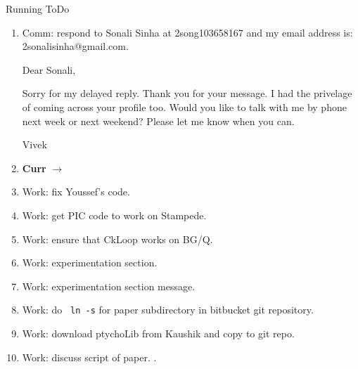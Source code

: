 \begin{columns}
\begin{column}{0.5\linewidth}
      \begin{block}{Running ToDo} %
        \begin{enumerate} 
            \item \tiny Comm: respond to Sonali Sinha at 2song103658167
            and my email address is: 2sonalisinha@gmail.com.

            Dear Sonali,

            Sorry for my delayed reply. Thank you for your message. I had
            the privelage of coming across your profile too. Would
            you like to talk with me by phone next week or next weekend? 
            Please let me know when you can.
           
            Vivek

          \item \tiny \textbf{Curr} $\rightarrow$
          \item \tiny Work: fix Youssef's code. 
          \item \tiny Work: get PIC code to work on Stampede. 
          \item \tiny Work: ensure that CkLoop works on BG/Q. 
          \item \tiny Work: experimentation section. 
          \item \tiny Work: experimentation section message.
          \item \tiny Work: do \texttt{ ln -s} for paper subdirectory in bitbucket git repository.
          \item \tiny Work: download ptychoLib from Kaushik and copy to git repo.            
          \item \tiny Work: discuss script of paper. 
             . 


\end{enumerate}
\end{block}
\end{column}
\end{columns}
